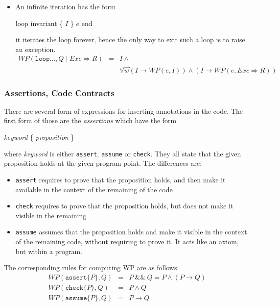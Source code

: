 \begin{itemize}
\item An infinite iteration has the form
\begin{flushleft}\ttfamily
  loop invariant \{ $I$ \} $e$ end
\end{flushleft}
it iterates the loop forever, hence the only way to exit such a loop is to raise an exception.
\begin{eqnarray*}
  WP(\texttt{loop} \ldots, Q \mid Exc \Rightarrow R) &=& I \land \\
&& \forall \vec{w} (I \rightarrow WP(e,I)) \land (I \rightarrow WP(e,Exc \Rightarrow R))
\end{eqnarray*}
\end{itemize}

\subsubsection{Assertions, Code Contracts}

There are several form of expressions for inserting annotations in the code.
The first form of those are the \emph{assertions} which have the form
\begin{flushleft}\ttfamily
  \textsl{keyword} \{ \textsl{proposition} \}
\end{flushleft}
where \textsl{keyword} is either \texttt{assert}, \texttt{assume} or
\texttt{check}. They all state that the given proposition holds at the given program point. The differences are:
\begin{itemize}
\item \texttt{assert} requires to prove that the proposition holds, and then make it available in the context of the remaining of the code
\item \texttt{check} requires to prove that the proposition holds, but
  does not make it visible in the remaining
\item \texttt{assume} assumes that the proposition holds and make it
  visible in the context of the remaining code, without requiring to
  prove it. It acts like an axiom, but within a program.
\end{itemize}
The corresponding rules for computing WP are as follows:
\begin{eqnarray*}
  WP(\texttt{assert} \{ P \}, Q) &=& P \mathop{\&\&} Q = P \land (P \rightarrow Q)\\
  WP(\texttt{check} \{ P \}, Q) &=& P \land Q \\
  WP(\texttt{assume} \{ P \}, Q) &=& P \rightarrow Q
\end{eqnarray*}

